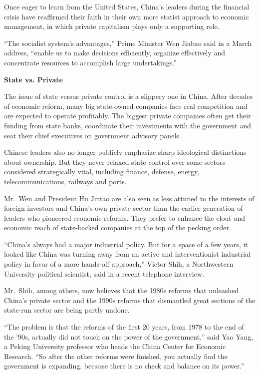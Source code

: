 ﻿\documentclass[12pt]{article}
\begin{document}
Once eager to learn from the United States, China's leaders during the financial crisis have
reaffirmed their faith in their own more statist approach to economic management, in which private
capitalism plays only a supporting role.

``The socialist system's advantages,'' Prime Minister Wen Jiabao said in a March address, ``enable
us to make decisions efficiently, organize effectively and concentrate resources to accomplish large
undertakings.''

\textbf{State vs. Private}

The issue of state versus private control is a slippery one in China. After decades of economic
reform, many big state-owned companies face real competition and are expected to operate profitably.
The biggest private companies often get their funding from state banks, coordinate their investments
with the government and seat their chief executives on government advisory panels.

Chinese leaders also no longer publicly emphasize sharp ideological distinctions about ownership.
But they never relaxed state control over some sectors considered strategically vital, including
finance, defense, energy, telecommunications, railways and ports.

Mr.~Wen and President Hu Jintao are also seen as less attuned to the interests of foreign investors
and China's own private sector than the earlier generation of leaders who pioneered economic
reforms. They prefer to enhance the clout and economic reach of state-backed companies at the top of
the pecking order.

``China's always had a major industrial policy. But for a space of a few years, it looked like China
was turning away from an active and interventionist industrial policy in favor of a more hands-off
approach,'' Victor Shih, a Northwestern University political scientist, said in a recent telephone
interview.

Mr.~Shih, among others, now believes that the 1980s reforms that unleashed China's private sector
and the 1990s reforms that dismantled great sections of the state-run sector are being partly
undone.

``The problem is that the reforms of the first 20 years, from 1978 to the end of the '90s, actually
did not touch on the power of the government,'' said Yao Yang, a Peking University professor who
heads the China Center for Economic Research. ``So after the other reforms were finished, you
actually find the government is expanding, because there is no check and balance on its power.''
\end{document}
